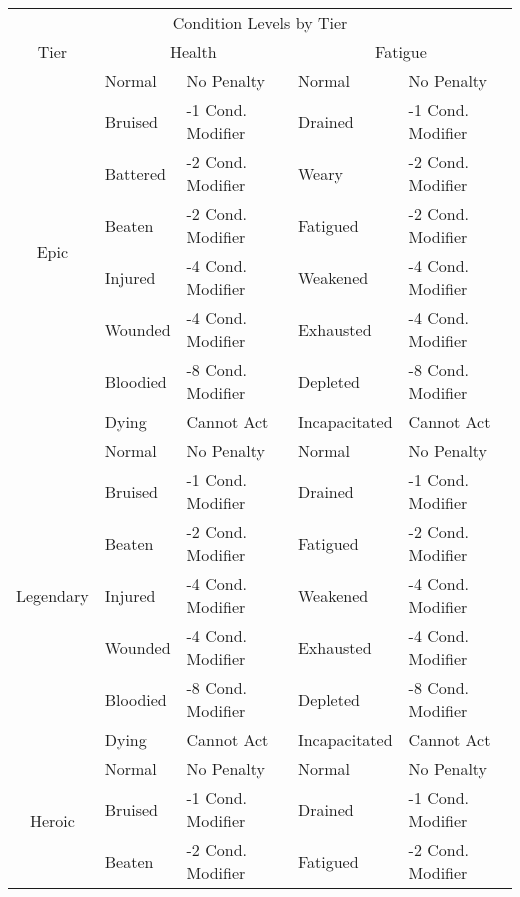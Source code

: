 \documentclass[11pt]{article}
\begin{document}
\newpage
\begin{center}
	\begin{tabular}{|c|ll|ll|}
		\multicolumn{5}{c}{Condition Levels by Tier}                                                            \\
		\multicolumn{1}{c}{Tier} & \multicolumn{2}{c}{Health} & \multicolumn{2}{c}{Fatigue} \\
		\hline
		\multirow{8}{*}{Epic}
		 & Normal   & No Penalty              & Normal        & No Penalty              \\
		 & Bruised  & -1  Cond. Modifier & Drained       & -1  Cond. Modifier \\
		 & Battered & -2  Cond. Modifier & Weary         & -2  Cond. Modifier \\
		 & Beaten   & -2  Cond. Modifier & Fatigued      & -2  Cond. Modifier \\
		 & Injured  & -4  Cond. Modifier & Weakened      & -4  Cond. Modifier \\
		 & Wounded  & -4  Cond. Modifier & Exhausted     & -4  Cond. Modifier \\
		 & Bloodied & -8  Cond. Modifier & Depleted      & -8  Cond. Modifier \\
		 & Dying    & Cannot Act              & Incapacitated & Cannot Act              \\
		\hline
		\multirow{7}{*}{Legendary}
		 & Normal   & No Penalty              & Normal        & No Penalty              \\
		 & Bruised  & -1  Cond. Modifier & Drained       & -1  Cond. Modifier \\
		 & Beaten   & -2  Cond. Modifier & Fatigued      & -2  Cond. Modifier \\
		 & Injured  & -4  Cond. Modifier & Weakened      & -4  Cond. Modifier \\
		 & Wounded  & -4  Cond. Modifier & Exhausted     & -4  Cond. Modifier \\
		 & Bloodied & -8  Cond. Modifier & Depleted      & -8  Cond. Modifier \\
		 & Dying    & Cannot Act              & Incapacitated & Cannot Act              \\
		\hline
		\multirow{6}{*}{Heroic}
		 & Normal   & No Penalty              & Normal        & No Penalty              \\
		 & Bruised  & -1  Cond. Modifier & Drained       & -1  Cond. Modifier \\
		 & Beaten   & -2  Cond. Modifier & Fatigued      & -2  Cond. Modifier \\

\end{tabular}
\end{center}
\end{document}

